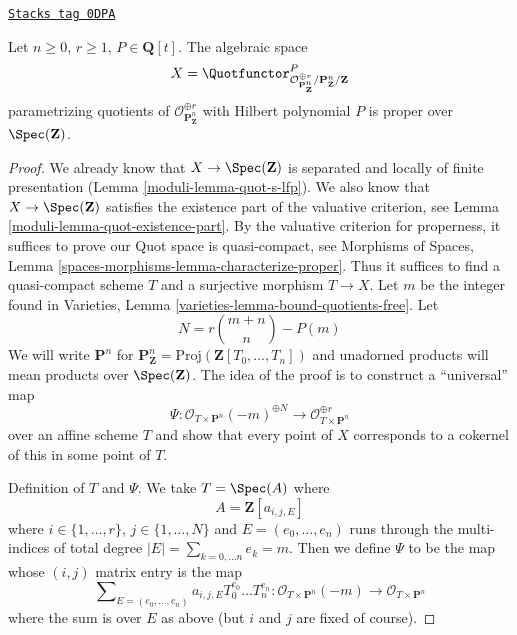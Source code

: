 \begin{lemma}[Quot Pn]
\label{moduli-lemma-quot-Pn}
\href{https://stacks.math.columbia.edu/tag/0DPA}{\texttt{Stacks tag 0DPA}}

Let $n \geq 0$, $r \geq 1$, $P \in \mathbf{Q}[t]$.
The algebraic space
$$
X = \Quotfunctor^P_{\mathcal{O}^{\oplus r}_{\mathbf{P}^n_\mathbf{Z}}/
\mathbf{P}^n_\mathbf{Z}/\mathbf{Z}}
$$
parametrizing quotients of $\mathcal{O}_{\mathbf{P}^n_\mathbf{Z}}^{\oplus r}$
with Hilbert polynomial $P$ is proper over $\Spec(\mathbf{Z})$.
\end{lemma}

\begin{proof}

We already know that $X \to \Spec(\mathbf{Z})$ is separated and
locally of finite presentation (Lemma \ref{moduli-lemma-quot-s-lfp}).
We also know that $X \to \Spec(\mathbf{Z})$ satisfies the
existence part of the valuative criterion, see
Lemma \ref{moduli-lemma-quot-existence-part}.
By the valuative criterion for properness, it suffices to
prove our Quot space is quasi-compact, see
Morphisms of Spaces,
Lemma \ref{spaces-morphisms-lemma-characterize-proper}.
Thus it suffices to find a quasi-compact scheme $T$ and a surjective
morphism $T \to X$. Let $m$ be the integer found in
Varieties, Lemma \ref{varieties-lemma-bound-quotients-free}.
Let
$$
N = r{m + n \choose n} - P(m)
$$
We will write $\mathbf{P}^n$ for
$\mathbf{P}^n_\mathbf{Z} = \text{Proj}(\mathbf{Z}[T_0, \ldots, T_n])$
and unadorned products will mean products over $\Spec(\mathbf{Z})$.
The idea of the proof is to construct a ``universal'' map
$$
\Psi :
\mathcal{O}_{T \times \mathbf{P}^n}(-m)^{\oplus N}
\longrightarrow
\mathcal{O}_{T \times \mathbf{P}^n}^{\oplus r}
$$
over an affine scheme $T$ and show that every point of $X$
corresponds to a cokernel of this in some point of $T$.

\medskip\noindent
Definition of $T$ and $\Psi$. We take $T = \Spec(A)$ where
$$
A = \mathbf{Z}[a_{i, j, E}]
$$
where $i \in \{1, \ldots, r\}$, $j \in \{1, \ldots, N\}$
and $E = (e_0, \ldots, e_n)$ runs through the multi-indices
of total degree $|E| = \sum_{k = 0, \ldots n} e_k = m$.
Then we define $\Psi$ to be the map whose $(i, j)$ matrix
entry is the map
$$
\sum\nolimits_{E = (e_0, \ldots, e_n)}
a_{i, j, E} T_0^{e_0} \ldots T_n^{e_n} :
\mathcal{O}_{T \times \mathbf{P}^n}(-m)
\longrightarrow
\mathcal{O}_{T \times \mathbf{P}^n}
$$
where the sum is over $E$ as above (but $i$ and $j$ are fixed of course).


\end{proof}
